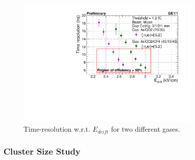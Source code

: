 \begin{figure}[!htbp]
\centering
\includegraphics[width=3.5in]{figures/GEM/TimeResolution_wrt_EDrift.pdf}
\caption{Time-resolution w.r.t. $E_{drift}$ for two different gases.}
\label{TimeResolution}
\end{figure}



\subsubsection{Cluster Size Study}

